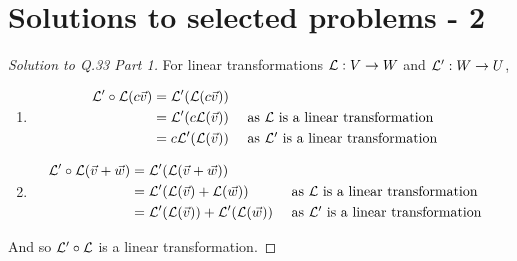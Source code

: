 
\section*{Solutions to selected problems - 2}

\begin{proof}[Solution to Q.33 Part 1]
  For linear transformations $\mathcal{L}: V \rightarrow W$ and $\mathcal{L}': W \rightarrow U$,
  \begin{enumerate}
    \item \begin{align*}
      \mathcal{L}' \circ \mathcal{L}(c \vec{v})
      &= \mathcal{L}' ( \mathcal{L}(c \vec{v})) \\
      &= \mathcal{L}' ( c\mathcal{L}(\vec{v})) && \mbox{ as $\mathcal{L}$ is a linear transformation}\\
      &= c \mathcal{L}' ( \mathcal{L}(\vec{v})) && \mbox{ as $\mathcal{L}'$ is a linear transformation}
    \end{align*}
    \item \begin{align*}
      \mathcal{L}' \circ \mathcal{L}(\vec{v} + \vec{w})
      &= \mathcal{L}' ( \mathcal{L}(\vec{v} + \vec{w})) \\
      &= \mathcal{L}' ( \mathcal{L}(\vec{v}) + \mathcal{L}(\vec{w})) && \mbox{ as $\mathcal{L}$ is a linear transformation}\\
      &= \mathcal{L}' ( \mathcal{L}(\vec{v})) + \mathcal{L}' ( \mathcal{L}(\vec{w})) && \mbox{ as $\mathcal{L}'$ is a linear transformation}
    \end{align*}
  \end{enumerate}
  And so $\mathcal{L}' \circ \mathcal{L}$ is a linear transformation.
\end{proof}

